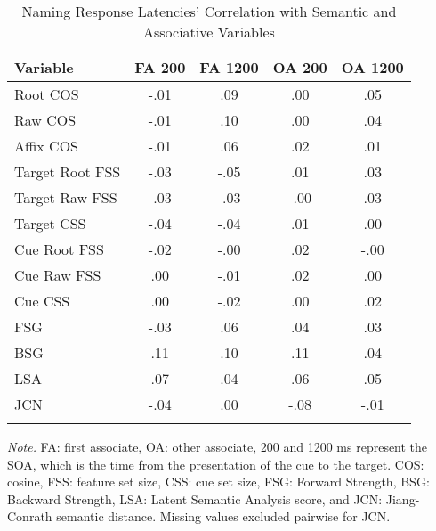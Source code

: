 \documentclass[english,,man]{apa6}
\theoremstyle{definition}
\theoremstyle{definition}
\theoremstyle{definition}
\theoremstyle{remark}
\begin{document}
\begin{table}[tbp]
\begin{center}
\begin{threeparttable}
\caption{\label{tab:name-table}Naming Response Latencies' Correlation with Semantic and Associative Variables}
\begin{tabular}{lcccc}
\toprule
Variable & \multicolumn{1}{c}{FA 200} & \multicolumn{1}{c}{FA 1200} & \multicolumn{1}{c}{OA 200} & \multicolumn{1}{c}{OA 1200}\\
\midrule
Root COS & -.01 & .09 & .00 & .05\\
Raw COS & -.01 & .10 & .00 & .04\\
Affix COS & -.01 & .06 & .02 & .01\\
Target Root FSS & -.03 & -.05 & .01 & .03\\
Target Raw FSS & -.03 & -.03 & -.00 & .03\\
Target CSS & -.04 & -.04 & .01 & .00\\
Cue Root FSS & -.02 & -.00 & .02 & -.00\\
Cue Raw FSS & .00 & -.01 & .02 & .00\\
Cue CSS & .00 & -.02 & .00 & .02\\
FSG & -.03 & .06 & .04 & .03\\
BSG & .11 & .10 & .11 & .04\\
LSA & .07 & .04 & .06 & .05\\
JCN & -.04 & .00 & -.08 & -.01\\
\bottomrule
\addlinespace
\end{tabular}
\begin{tablenotes}[para]
\normalsize{\textit{Note.} FA: first associate, OA: other associate, 200 and 1200 ms represent the SOA, which is the time from the presentation of the cue to the target. COS: cosine, FSS: feature set size, CSS: cue set size, FSG: Forward Strength, BSG: Backward Strength, LSA: Latent Semantic Analysis score, and JCN: Jiang-Conrath semantic distance. Missing values excluded pairwise for JCN.}
\end{tablenotes}
\end{threeparttable}
\end{center}
\end{table}
\end{document}

